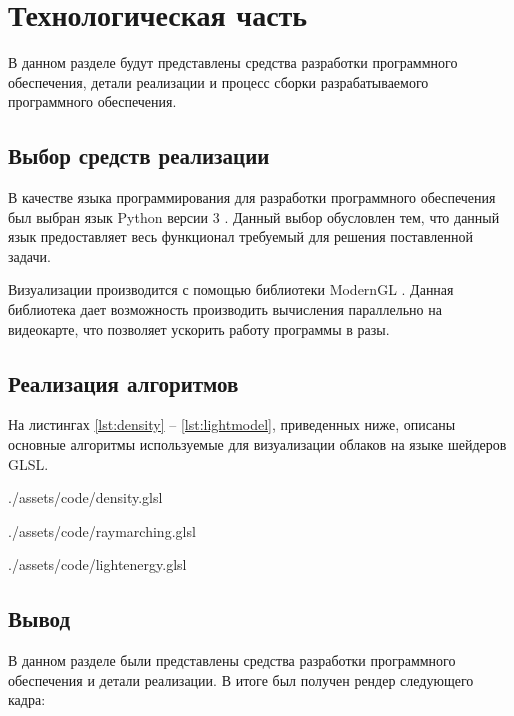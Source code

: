 \chapter{Технологическая часть}

В данном разделе будут представлены средства разработки программного обеспечения, детали реализации и процесс сборки разрабатываемого
программного обеспечения.

\section{Выбор средств реализации}

В качестве языка программирования для разработки программного обеспечения был выбран язык Python версии 3 \cite{python}. Данный выбор обусловлен тем, что данный язык предоставляет весь функционал требуемый для решения поставленной задачи. 

Визуализации производится с помощью библиотеки ModernGL \cite{moderngl}. Данная библиотека дает возможность производить вычисления параллельно на видеокарте, что позволяет ускорить работу программы в разы. 


\section{Реализация алгоритмов}

На листингах \ref{lst:density} -- \ref{lst:lightmodel}, приведенных ниже, описаны основные алгоритмы используемые для визуализации облаков на языке шейдеров GLSL.

\clearpage

\begin{lstinputlisting}[
	caption={Реализация функции определяющей плотность в точке},
	language=GLSL,
	label={lst:density},
	linerange={1-172,311-311}
	]{./assets/code/density.glsl}
\end{lstinputlisting}


\clearpage

\begin{lstinputlisting}[
	caption={Реализация алгоритма Ray Marching},
	language=GLSL,
	label={lst:raymarching},
	linerange={1-172,311-311}
	]{./assets/code/raymarching.glsl}
\end{lstinputlisting}


\clearpage

\begin{lstinputlisting}[
	caption={Реализация модели освещения},
	language=GLSL,
	label={lst:lightmodel},
	linerange={1-172,311-311}
	]{./assets/code/lightenergy.glsl}
\end{lstinputlisting}


\section{Вывод}

В данном разделе были представлены средства разработки программного обеспечения и детали реализации. В итоге был получен рендер следующего кадра:

